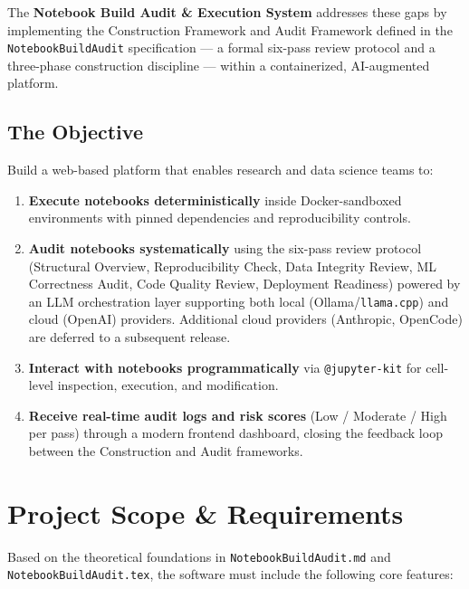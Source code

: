 \documentclass[11pt, a4paper]{article}
\begin{document}
The \textbf{Notebook Build Audit \& Execution System} addresses these gaps by
implementing the Construction Framework and Audit Framework defined in the
\texttt{NotebookBuildAudit} specification --- a formal six-pass review protocol
and a three-phase construction discipline --- within a containerized, AI-augmented
platform.

\subsection*{The Objective}

Build a web-based platform that enables research and data science teams to:

\begin{enumerate}
  \item \textbf{Execute notebooks deterministically} inside Docker-sandboxed
    environments with pinned dependencies and reproducibility controls.

  \item \textbf{Audit notebooks systematically} using the six-pass review protocol
    (Structural Overview, Reproducibility Check, Data Integrity Review, ML
    Correctness Audit, Code Quality Review, Deployment Readiness) powered by an
    LLM orchestration layer supporting both local (Ollama/\texttt{llama.cpp}) and
    cloud (OpenAI) providers. Additional cloud providers (Anthropic, OpenCode)
    are deferred to a subsequent release.

  \item \textbf{Interact with notebooks programmatically} via \texttt{@jupyter-kit}
    for cell-level inspection, execution, and modification.

  \item \textbf{Receive real-time audit logs and risk scores} (Low / Moderate /
    High per pass) through a modern frontend dashboard, closing the feedback loop
    between the Construction and Audit frameworks.
\end{enumerate}

\section{Project Scope \& Requirements}

Based on the theoretical foundations in \texttt{NotebookBuildAudit.md} and
\texttt{NotebookBuildAudit.tex}, the software must include the following core
features:
\end{document}
